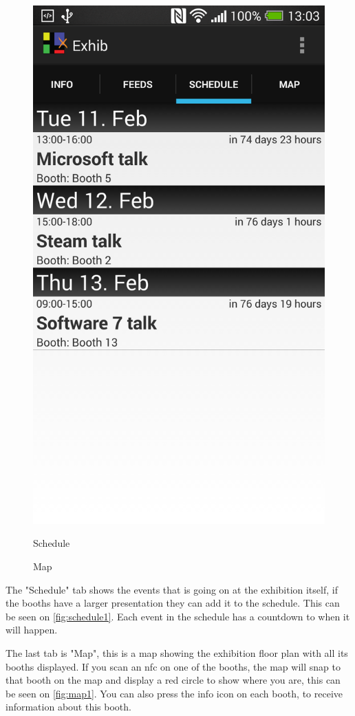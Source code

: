 \begin{figure}[H]
\begin{minipage}[b]{0.5\columnwidth}
\centering
\includegraphics[width=0.7\columnwidth]{img/finaldesign/schedule.png}
\caption{Schedule}
\label{fig:schedule1}
\end{minipage}
\hspace{0.5cm}
\begin{minipage}[b]{0.5\columnwidth}
\centering
\caption{Map}
\label{fig:map1}
%
\missingfigure{}
\end{minipage}
\end{figure}

The "Schedule" tab shows the events that is going on at the exhibition itself, if the booths have a larger presentation they can add it to the schedule. This can be seen on \autoref{fig:schedule1}. Each event in the schedule has a countdown to when it will happen. 

The last tab is "Map", this is a map showing the exhibition floor plan with all its booths displayed. If you scan an \ac{nfc} on one of the booths, the map will snap to that booth on the map and display a red circle to show where you are, this can be seen on \autoref{fig:map1}. You can also press the info icon on each booth, to receive information about this booth.

